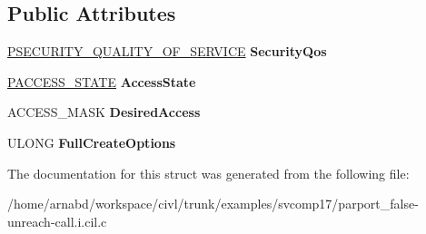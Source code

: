 \subsection*{Public Attributes}
\begin{DoxyCompactItemize}
\item 
\hypertarget{struct__IO__SECURITY__CONTEXT_a96eb476fbb6c0aa13b347f4e44711a36}{}\hyperlink{struct__SECURITY__QUALITY__OF__SERVICE}{P\+S\+E\+C\+U\+R\+I\+T\+Y\+\_\+\+Q\+U\+A\+L\+I\+T\+Y\+\_\+\+O\+F\+\_\+\+S\+E\+R\+V\+I\+C\+E} {\bfseries Security\+Qos}\label{struct__IO__SECURITY__CONTEXT_a96eb476fbb6c0aa13b347f4e44711a36}

\item 
\hypertarget{struct__IO__SECURITY__CONTEXT_a4a71133f8dcbf8e4a0ae8d707af6af6a}{}\hyperlink{struct__ACCESS__STATE}{P\+A\+C\+C\+E\+S\+S\+\_\+\+S\+T\+A\+T\+E} {\bfseries Access\+State}\label{struct__IO__SECURITY__CONTEXT_a4a71133f8dcbf8e4a0ae8d707af6af6a}

\item 
\hypertarget{struct__IO__SECURITY__CONTEXT_ac7740d48c39152a386497309d8349b21}{}A\+C\+C\+E\+S\+S\+\_\+\+M\+A\+S\+K {\bfseries Desired\+Access}\label{struct__IO__SECURITY__CONTEXT_ac7740d48c39152a386497309d8349b21}

\item 
\hypertarget{struct__IO__SECURITY__CONTEXT_acfaa915133d0e3babef214d5e0eec9ad}{}U\+L\+O\+N\+G {\bfseries Full\+Create\+Options}\label{struct__IO__SECURITY__CONTEXT_acfaa915133d0e3babef214d5e0eec9ad}

\end{DoxyCompactItemize}


The documentation for this struct was generated from the following file\+:\begin{DoxyCompactItemize}
\item 
/home/arnabd/workspace/civl/trunk/examples/svcomp17/parport\+\_\+false-\/unreach-\/call.\+i.\+cil.\+c\end{DoxyCompactItemize}
